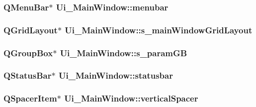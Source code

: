 \label{classUi__MainWindow_aed67342868bc3330ef288206a46c2e9f}
\hypertarget{classUi__MainWindow_adf43d9a67adaec750aaa956b5e082f09}{
\subsubsection[{menubar}]{\setlength{\rightskip}{0pt plus 5cm}QMenuBar$\ast$ {\bf Ui\_\-MainWindow::menubar}}}
\label{classUi__MainWindow_adf43d9a67adaec750aaa956b5e082f09}
\hypertarget{classUi__MainWindow_ae7902f78acf2ddd14bbda720ac54c450}{
\subsubsection[{s\_\-mainWindowGridLayout}]{\setlength{\rightskip}{0pt plus 5cm}QGridLayout$\ast$ {\bf Ui\_\-MainWindow::s\_\-mainWindowGridLayout}}}
\label{classUi__MainWindow_ae7902f78acf2ddd14bbda720ac54c450}
\hypertarget{classUi__MainWindow_aad6df58cb61e92bd39ce02dcc8a4bd89}{
\subsubsection[{s\_\-paramGB}]{\setlength{\rightskip}{0pt plus 5cm}QGroupBox$\ast$ {\bf Ui\_\-MainWindow::s\_\-paramGB}}}
\label{classUi__MainWindow_aad6df58cb61e92bd39ce02dcc8a4bd89}
\hypertarget{classUi__MainWindow_a1687cceb1e2787aa1f83e50433943a91}{
\subsubsection[{statusbar}]{\setlength{\rightskip}{0pt plus 5cm}QStatusBar$\ast$ {\bf Ui\_\-MainWindow::statusbar}}}
\label{classUi__MainWindow_a1687cceb1e2787aa1f83e50433943a91}
\hypertarget{classUi__MainWindow_a8384329c3663ff274e926a12024aab52}{
\subsubsection[{verticalSpacer}]{\setlength{\rightskip}{0pt plus 5cm}QSpacerItem$\ast$ {\bf Ui\_\-MainWindow::verticalSpacer}}}
